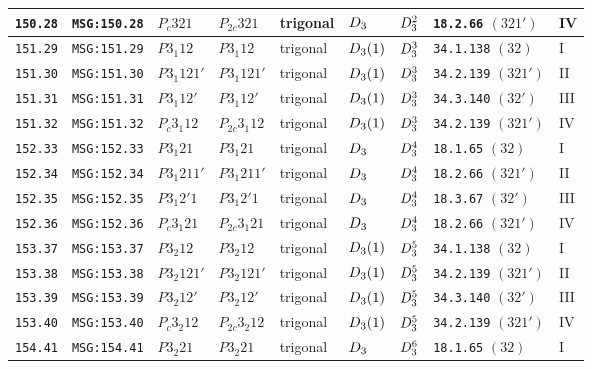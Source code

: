 \documentclass[fleqn,10pt]{jsarticle}
\begin{document}
\begin{center}
\begin{longtable}{lllllllll}
\texttt{150.28} & \texttt{MSG:150.28} & $P_{c}321$ & $P_{2c}321$ & trigonal & $D_{\rm 3}$ & $D_{\rm 3}^{2}$ & \texttt{18.2.66} $(321')$ & IV \\ \hline
\texttt{151.29} & \texttt{MSG:151.29} & $P3_{1}12$ & $P3_{1}12$ & trigonal & $D_{\rm 3}(1)$ & $D_{\rm 3}^{3}$ & \texttt{34.1.138} $(32)$ & I \\
\texttt{151.30} & \texttt{MSG:151.30} & $P3_{1}121'$ & $P3_{1}121'$ & trigonal & $D_{\rm 3}(1)$ & $D_{\rm 3}^{3}$ & \texttt{34.2.139} $(321')$ & II \\
\texttt{151.31} & \texttt{MSG:151.31} & $P3_{1}12'$ & $P3_{1}12'$ & trigonal & $D_{\rm 3}(1)$ & $D_{\rm 3}^{3}$ & \texttt{34.3.140} $(32')$ & III \\
\texttt{151.32} & \texttt{MSG:151.32} & $P_{c}3_{1}12$ & $P_{2c}3_{1}12$ & trigonal & $D_{\rm 3}(1)$ & $D_{\rm 3}^{3}$ & \texttt{34.2.139} $(321')$ & IV \\ \hline
\texttt{152.33} & \texttt{MSG:152.33} & $P3_{1}21$ & $P3_{1}21$ & trigonal & $D_{\rm 3}$ & $D_{\rm 3}^{4}$ & \texttt{18.1.65} $(32)$ & I \\
\texttt{152.34} & \texttt{MSG:152.34} & $P3_{1}211'$ & $P3_{1}211'$ & trigonal & $D_{\rm 3}$ & $D_{\rm 3}^{4}$ & \texttt{18.2.66} $(321')$ & II \\
\texttt{152.35} & \texttt{MSG:152.35} & $P3_{1}2'1$ & $P3_{1}2'1$ & trigonal & $D_{\rm 3}$ & $D_{\rm 3}^{4}$ & \texttt{18.3.67} $(32')$ & III \\
\texttt{152.36} & \texttt{MSG:152.36} & $P_{c}3_{1}21$ & $P_{2c}3_{1}21$ & trigonal & $D_{\rm 3}$ & $D_{\rm 3}^{4}$ & \texttt{18.2.66} $(321')$ & IV \\ \hline
\texttt{153.37} & \texttt{MSG:153.37} & $P3_{2}12$ & $P3_{2}12$ & trigonal & $D_{\rm 3}(1)$ & $D_{\rm 3}^{5}$ & \texttt{34.1.138} $(32)$ & I \\
\texttt{153.38} & \texttt{MSG:153.38} & $P3_{2}121'$ & $P3_{2}121'$ & trigonal & $D_{\rm 3}(1)$ & $D_{\rm 3}^{5}$ & \texttt{34.2.139} $(321')$ & II \\
\texttt{153.39} & \texttt{MSG:153.39} & $P3_{2}12'$ & $P3_{2}12'$ & trigonal & $D_{\rm 3}(1)$ & $D_{\rm 3}^{5}$ & \texttt{34.3.140} $(32')$ & III \\
\texttt{153.40} & \texttt{MSG:153.40} & $P_{c}3_{2}12$ & $P_{2c}3_{2}12$ & trigonal & $D_{\rm 3}(1)$ & $D_{\rm 3}^{5}$ & \texttt{34.2.139} $(321')$ & IV \\ \hline
\texttt{154.41} & \texttt{MSG:154.41} & $P3_{2}21$ & $P3_{2}21$ & trigonal & $D_{\rm 3}$ & $D_{\rm 3}^{6}$ & \texttt{18.1.65} $(32)$ & I \\

\end{longtable}
\end{center}
\end{document}
